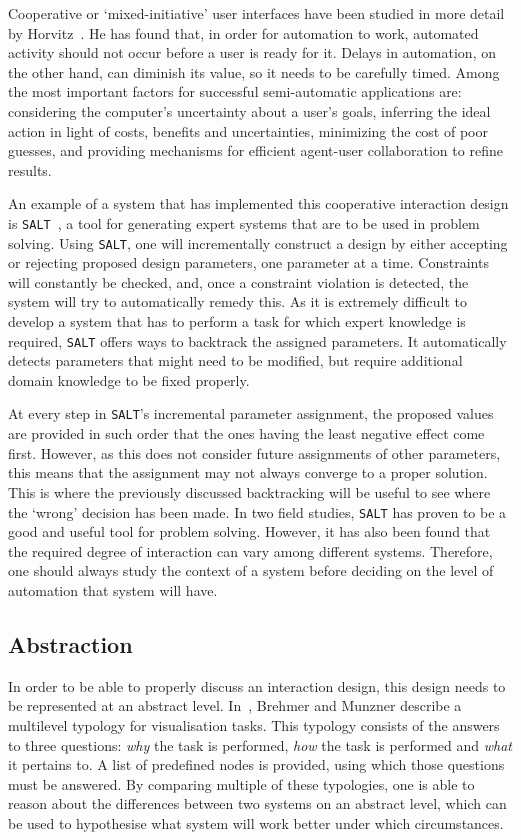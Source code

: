 Cooperative or `mixed-initiative' user interfaces have been studied in more detail by Horvitz~\cite{horvitz1999principles}. He has found that, in order for automation to work, automated activity should not occur before a user is ready for it. Delays in automation, on the other hand, can diminish its value, so it needs to be carefully timed. Among the most important factors for successful semi-automatic applications are: considering the computer's uncertainty about a user's goals, inferring the ideal action in light of costs, benefits and uncertainties, minimizing the cost of poor guesses, and providing mechanisms for efficient agent-user collaboration to refine results.

An example of a system that has implemented this cooperative interaction design is \verb|SALT|~\cite{marcus1987taking}, a tool for generating expert systems that are to be used in problem solving. Using \verb|SALT|, one will incrementally construct a design by either accepting or rejecting proposed design parameters, one parameter at a time. Constraints will constantly be checked, and, once a constraint violation is detected, the system will try to automatically remedy this. As it is extremely difficult to develop a system that has to perform a task for which expert knowledge is required, \verb|SALT| offers ways to backtrack the assigned parameters. It automatically detects parameters that might need to be modified, but require additional domain knowledge to be fixed properly.

At every step in \verb|SALT|'s incremental parameter assignment, the proposed values are provided in such order that the ones having the least negative effect come first. However, as this does not consider future assignments of other parameters, this means that the assignment may not always converge to a proper solution. This is where the previously discussed backtracking will be useful to see where the `wrong' decision has been made. In two field studies, \verb|SALT| has proven to be a good and useful tool for problem solving. However, it has also been found that the required degree of interaction can vary among different systems. Therefore, one should always study the context of a system before deciding on the level of automation that system will have.

\subsection{Abstraction}
In order to be able to properly discuss an interaction design, this design needs to be represented at an abstract level. In~\cite{brehmer2013multi}, Brehmer and Munzner describe a multilevel typology for visualisation tasks. This typology consists of the answers to three questions: \textit{why} the task is performed, \textit{how} the task is performed and \textit{what} it pertains to. A list of predefined nodes is provided, using which those questions must be answered. By comparing multiple of these typologies, one is able to reason about the differences between two systems on an abstract level, which can be used to hypothesise what system will work better under which circumstances.


